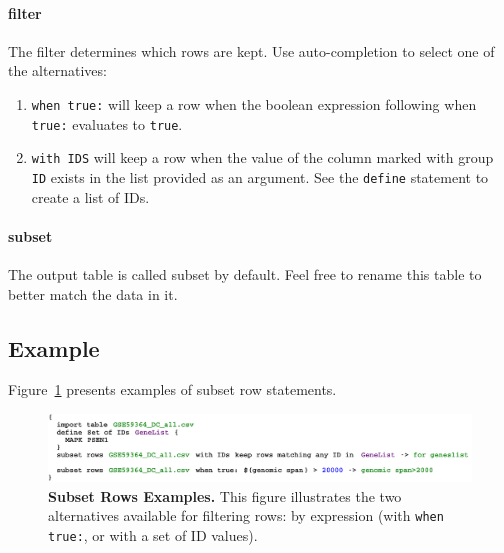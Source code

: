 \paragraph{filter}
The filter determines which rows are kept. Use auto-completion to select one of the alternatives:
\begin{enumerate}
	\item \texttt{when true:} will keep a row when the boolean expression following when \texttt{true:} evaluates to  \texttt{true}.
	\item \texttt{with IDS} will keep a row when the value of the column marked with group \texttt{ID} exists in the list provided as an argument. See the \texttt{define} statement to create a list of IDs. 
\end{enumerate}

\paragraph{subset}
The output table is called subset by default. Feel free to rename this table to better match the data in it.

\subsection{Example}
Figure~\ref{fig:ExampleSubsetRows} presents examples of subset row statements. 

\begin{figure}[h!tbp]
  \centering
  \includegraphics[width=\figWidthWide]{figures/ExampleSubsetRows.pdf}
\caption[Subset Rows Examples.]{\textbf{Subset Rows Examples.} This figure illustrates the two alternatives available for filtering rows: by expression (with \texttt{when true:}, or with a set of ID values).}
\label{fig:ExampleSubsetRows}
\end{figure}

